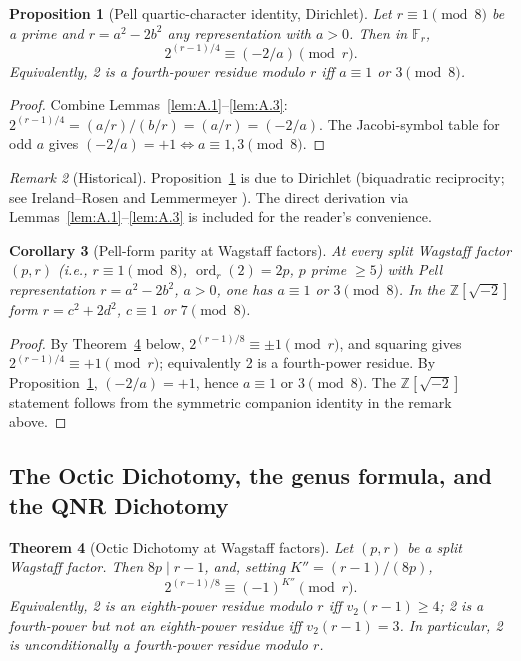 \documentclass[12pt]{article}
\theoremstyle{plain}
\newtheorem{theorem}{Theorem}[section]
\newtheorem{proposition}[theorem]{Proposition}
\newtheorem{corollary}[theorem]{Corollary}
\theoremstyle{definition}
\theoremstyle{remark}
\newtheorem{remark}[theorem]{Remark}
\begin{document}
\begin{proposition}[Pell quartic-character identity, Dirichlet]\label{prop:A.4}
Let \(r \equiv 1 \pmod 8\) be a prime and \(r = a^2 - 2b^2\) any
representation with \(a > 0\). Then in \(\mathbb F_r\),
\[
2^{(r-1)/4} \equiv (-2/a) \pmod r.
\]
Equivalently, 2 is a fourth-power residue modulo \(r\) iff
\(a \equiv 1\) or \(3 \pmod 8\).
\end{proposition}


\begin{proof}
Combine Lemmas~\ref{lem:A.1}--\ref{lem:A.3}:
\(2^{(r-1)/4} = (a/r)/(b/r) = (a/r) = (-2/a)\). The Jacobi-symbol
table for odd \(a\) gives
\((-2/a) = +1 \Leftrightarrow a \equiv 1, 3 \pmod 8\).\end{proof}


\begin{remark}[Historical]
Proposition~\ref{prop:A.4} is due to Dirichlet (biquadratic
reciprocity; see Ireland--Rosen \cite[Ch.~11]{ref11} and
Lemmermeyer \cite[\S\S5.3, 5.7]{ref13}). The direct
derivation via Lemmas~\ref{lem:A.1}--\ref{lem:A.3} is included
for the reader's convenience.
\end{remark}

\begin{corollary}[Pell-form parity at Wagstaff factors]\label{cor:A.5}
At
every split Wagstaff factor
\((p, r)\) (i.e., \(r \equiv 1 \pmod 8\), \(\operatorname{ord}_r(2) =
2p\), \(p\) prime \(\geq 5\)) with Pell representation
\(r = a^2 - 2b^2\), \(a > 0\), one has \(a \equiv 1\) or \(3 \pmod 8\).
In the \(\mathbb Z[\sqrt{-2}]\) form \(r = c^2 + 2d^2\),
\(c \equiv 1\) or \(7 \pmod 8\).
\end{corollary}


\begin{proof}
By Theorem~\ref{thm:A.6} below, \(2^{(r-1)/8} \equiv \pm 1 \pmod r\),
and squaring gives \(2^{(r-1)/4} \equiv +1 \pmod r\); equivalently
2 is a fourth-power residue. By Proposition~\ref{prop:A.4}, \((-2/a) = +1\),
hence \(a \equiv 1\) or \(3 \pmod 8\). The \(\mathbb Z[\sqrt{-2}]\)
statement follows from the symmetric companion identity in the
remark above.\end{proof}


\subsection{The Octic Dichotomy, the genus formula, and the QNR Dichotomy}


\begin{theorem}[Octic Dichotomy at Wagstaff factors]\label{thm:A.6}
Let
\((p, r)\) be a split Wagstaff factor. Then \(8p \mid r-1\), and,
setting \(K'' = (r-1)/(8p)\),
\[
2^{(r-1)/8} \equiv (-1)^{K''} \pmod r.
\]
Equivalently, 2 is an eighth-power residue modulo \(r\) iff
\(v_2(r-1) \geq 4\); 2 is a fourth-power but not an eighth-power
residue iff \(v_2(r-1) = 3\). In particular, 2 is unconditionally
a fourth-power residue modulo \(r\).
\end{theorem}
\end{document}
